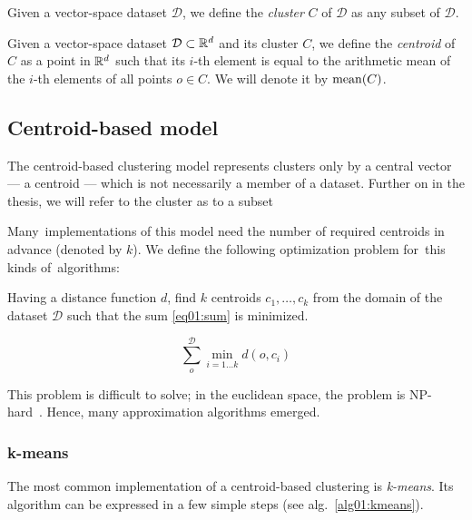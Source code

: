 \begin{defn}[Cluster]
	Given a vector-space dataset $\mathcal{D}$, we define the \emph{cluster} $C$ of $\mathcal{D}$ as any subset of $\mathcal{D}$.
\end{defn}

\begin{defn}[Centroid]
	Given a vector-space dataset $\mathcal{D}\subset\mathbb{R}^d$ and its cluster $C$, we define the \emph{centroid} of $C$ as a point in $\mathbb{R}^d$ such that its $i$-th element is equal to the arithmetic mean of the $i$-th elements of all points $o \in C$. We will denote it by $\operatorname{mean}(C)$.
	\label{def01:centr}
\end{defn}

\subsection{Centroid-based model}

The centroid-based clustering model represents clusters only by a central vector --- a centroid --- which is not necessarily a member of a dataset. Further on in the thesis, we will refer to the cluster as to a subset 

Many~implementations of this model need the number of required centroids in advance (denoted by $k$). We define the following optimization problem for~this kinds of~algorithms:

\begin{problem}
	Having a distance function $d$, find $k$ centroids $c_1,\dots,c_k$ from the domain of the dataset $\mathcal{D}$ such that the sum \ref{eq01:sum}
	is minimized.
\end{problem}

\begin{equation}\label{eq01:sum}
	\sum_o^{\mathcal{D}} \min_{i=1\dots k}d(o,c_i)
\end{equation}

This problem is difficult to solve; in the euclidean space, the problem is NP-hard~\cite{aloise2009np}. Hence, many approximation algorithms emerged. 

\subsubsection{k-means}

The most common implementation of a centroid-based clustering is \emph{k-means}. Its algorithm can be expressed in a few simple steps (see alg.~\ref{alg01:kmeans}).

